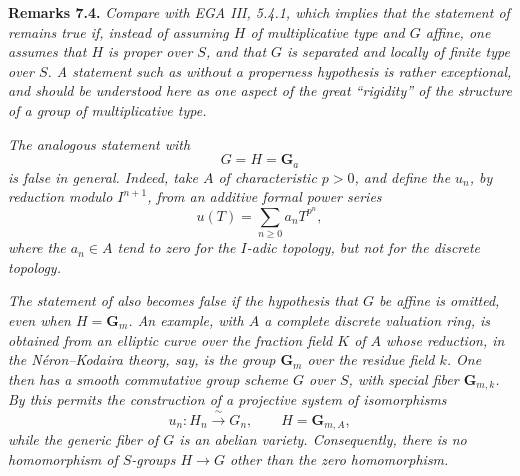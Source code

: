 \medskip
\noindent{}\textbf{Remarks 7.4.}
\textit{Compare  with EGA III,
5.4.1, which implies that the statement of  remains true if, instead
of assuming \(H\) of multiplicative type and \(G\) affine, one assumes
that \(H\) is proper over \(S\), and that \(G\) is separated and locally
of finite type over \(S\). A statement such as  without a properness
hypothesis is rather exceptional, and should be understood here as one
aspect of the great ``rigidity'' of the structure of a group of
multiplicative type.}

\textit{The analogous statement with
\[
  G=H=\mathbf G_a
\]
is false in general. Indeed, take \(A\) of characteristic \(p>0\), and
define the \(u_n\), by reduction modulo \(I^{n+1}\), from an additive
formal power series
\[
  u(T)=\sum_{n\geq0}a_nT^{p^n},
\]
where the \(a_n\in A\) tend to zero for the \(I\)-adic topology, but not
for the discrete topology.}

\textit{The statement of  also becomes false if the hypothesis that
\(G\) be affine is omitted, even when \(H=\mathbf G_m\). An example,
with \(A\) a complete discrete valuation ring, is obtained from an
elliptic curve over the fraction field \(K\) of \(A\) whose reduction,
in the N\'eron--Kodaira theory, say, is the group \(\mathbf G_m\) over the
residue field \(k\). One then has a smooth commutative group scheme \(G\)
over \(S\), with special fiber \(\mathbf G_{m,k}\). By  this permits
the construction of a projective system of isomorphisms
\[
  u_n:H_n\xrightarrow{\ \sim\ }G_n,
  \qquad H=\mathbf G_{m,A},
\]
while the generic fiber of \(G\) is an abelian variety. Consequently,
there is no homomorphism of \(S\)-groups \(H\to G\) other than the zero
homomorphism.}

